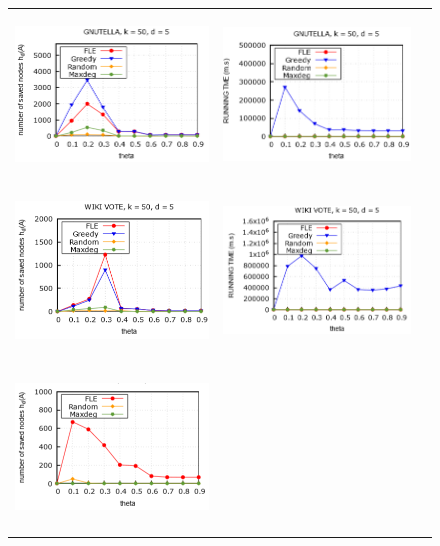 \begin{figure}
	\begin{tabular}{lll}
		\includegraphics[height = 4.4cm]{picture/FLE/gnu_res_theta} &
		\includegraphics[height = 4.4cm]{picture/FLE/gnu_time_theta} 
		\\
		\includegraphics[height = 4.4cm]{picture/FLE/wiki_res_theta} &
		\includegraphics[height = 4.4cm]{picture/FLE/wiki_time_theta} 
		\\
		\includegraphics[height = 4.4cm]{picture/FLE/amazon_res_theta} &

\end{tabular}
\end{figure}
